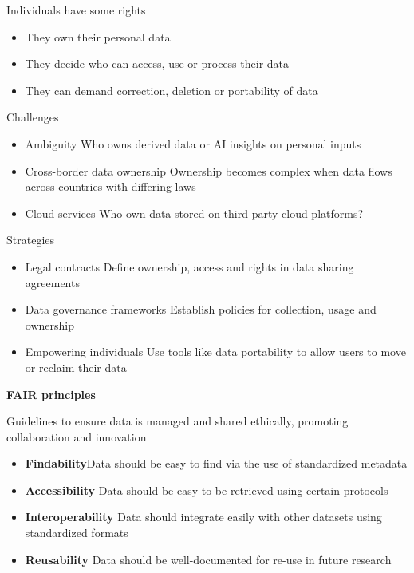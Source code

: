 \vspace{10pt}

Individuals have some rights
\begin{itemize}
    \item They own their personal data
    \item They decide who can access, use or process their data
    \item They can demand correction, deletion or portability of data
\end{itemize}

\vspace{10pt}

Challenges
\begin{itemize}
    \item Ambiguity \ra Who owns derived data or AI insights on personal inputs
    \item Cross-border data ownership \ra Ownership becomes complex when data flows across countries with differing laws
    \item Cloud services \ra Who own data stored on third-party cloud platforms?
\end{itemize}

Strategies
\begin{itemize}
    \item Legal contracts \ra Define ownership, access and rights in data sharing agreements
    \item Data governance frameworks \ra Establish policies for collection, usage and ownership
    \item Empowering individuals \ra Use tools like data portability to allow users to move or reclaim their data
\end{itemize}

\vspace{10pt}
\textbf{FAIR principles}
\vspace{10pt}

Guidelines to ensure data is managed and shared ethically, promoting collaboration and innovation

\begin{itemize}
    \item \textbf{Findability}\ra Data should be easy to find via the use of standardized metadata
    \item \textbf{Accessibility} \ra Data should be easy to be retrieved using certain protocols
    \item \textbf{Interoperability} \ra Data should integrate easily with other datasets using standardized formats
    \item \textbf{Reusability} \ra Data should be well-documented for re-use in future research
\end{itemize} 


